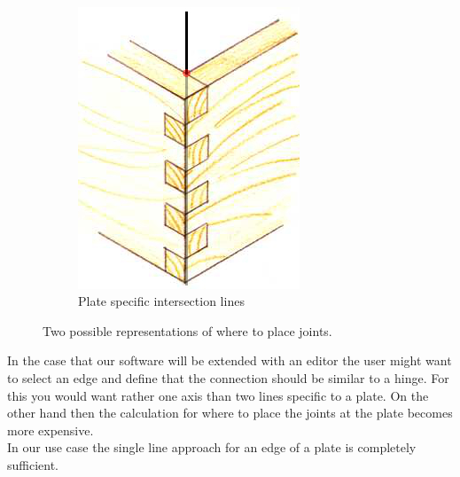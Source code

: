 \documentclass[../ClassicThesis.tex]{subfiles}
\begin{document}
\begin{figure}
~
\begin{subfigure}[b]{0.45\textwidth}
\includegraphics[width=\columnwidth]{Images/woodenFingers2.jpg}
\caption{Plate specific intersection lines}
\end{subfigure}
\caption{Two possible representations of where to place joints.}
    \label{fig:hinges}
\end{figure}
In the case that our software will be extended with an editor the user might want to select an edge and define that the connection should be similar to a hinge. For this you would want rather one axis than two lines specific to a plate. On the other hand then the calculation for where to place the joints at the plate becomes more expensive.\\
In our use case the single line approach for an edge of a plate is completely sufficient.
\end{document}
